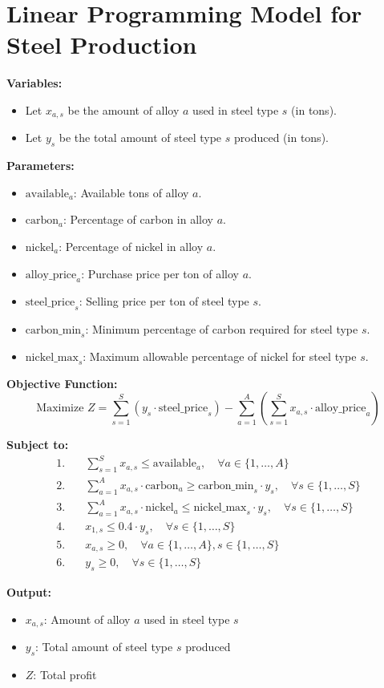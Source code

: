 \documentclass{article}
\begin{document}
\section*{Linear Programming Model for Steel Production}

\textbf{Variables:}
\begin{itemize}
    \item Let \( x_{a,s} \) be the amount of alloy \( a \) used in steel type \( s \) (in tons).
    \item Let \( y_s \) be the total amount of steel type \( s \) produced (in tons).
\end{itemize}

\textbf{Parameters:}
\begin{itemize}
    \item \( \text{available}_{a} \): Available tons of alloy \( a \).
    \item \( \text{carbon}_{a} \): Percentage of carbon in alloy \( a \).
    \item \( \text{nickel}_{a} \): Percentage of nickel in alloy \( a \).
    \item \( \text{alloy\_price}_{a} \): Purchase price per ton of alloy \( a \).
    \item \( \text{steel\_price}_{s} \): Selling price per ton of steel type \( s \).
    \item \( \text{carbon\_min}_{s} \): Minimum percentage of carbon required for steel type \( s \).
    \item \( \text{nickel\_max}_{s} \): Maximum allowable percentage of nickel for steel type \( s \).
\end{itemize}

\textbf{Objective Function:}
\[
\text{Maximize } Z = \sum_{s=1}^{S} \left( y_s \cdot \text{steel\_price}_{s} \right) - \sum_{a=1}^{A} \left( \sum_{s=1}^{S} x_{a,s} \cdot \text{alloy\_price}_{a} \right)
\]

\textbf{Subject to:}
\begin{align*}
1. & \quad \sum_{s=1}^{S} x_{a,s} \leq \text{available}_{a}, \quad \forall a \in \{1, \ldots, A\} \\
2. & \quad \sum_{a=1}^{A} x_{a,s} \cdot \text{carbon}_{a} \geq \text{carbon\_min}_{s} \cdot y_s, \quad \forall s \in \{1, \ldots, S\} \\
3. & \quad \sum_{a=1}^{A} x_{a,s} \cdot \text{nickel}_{a} \leq \text{nickel\_max}_{s} \cdot y_s, \quad \forall s \in \{1, \ldots, S\} \\
4. & \quad x_{1,s} \leq 0.4 \cdot y_s, \quad \forall s \in \{1, \ldots, S\} \\
5. & \quad x_{a,s} \geq 0, \quad \forall a \in \{1, \ldots, A\}, s \in \{1, \ldots, S\} \\
6. & \quad y_s \geq 0, \quad \forall s \in \{1, \ldots, S\}
\end{align*}

\textbf{Output:}
\begin{itemize}
    \item \( x_{a,s} \): Amount of alloy \( a \) used in steel type \( s \)
    \item \( y_s \): Total amount of steel type \( s \) produced
    \item \( Z \): Total profit
\end{itemize}
\end{document}

